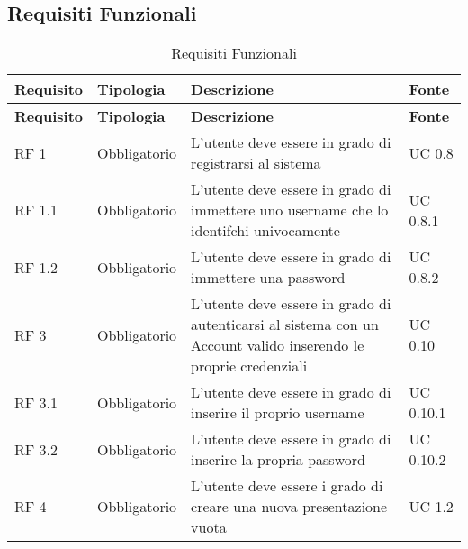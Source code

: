 \subsection{Requisiti Funzionali}{
	\renewcommand*{\arraystretch}{1.4}
	\begin{longtable} [c]{| p{2.5cm} | p{2.5cm} | p{6cm} |p{2.5cm}|}
		\caption{Requisiti Funzionali \label{tab:reqFunzionali}}\\
	 \hline
	 \textbf{Requisito} & \textbf{Tipologia} & \textbf{Descrizione} & \textbf{Fonte} \\
	 \hline
	 \endfirsthead
	 \hline
	 \textbf{Requisito} & \textbf{Tipologia} & \textbf{Descrizione} & \textbf{Fonte} \\
	 \hline
			\endhead
	 \hline
	 \endfoot
	 \hline
	 \endlastfoot
		RF 1 & Obbligatorio & L'utente deve essere in grado di registrarsi al sistema & UC 0.8\\
		\hline
		RF 1.1 & Obbligatorio & L'utente deve essere in grado di immettere uno username che lo identifchi univocamente & UC 0.8.1\\
		\hline
		RF 1.2 & Obbligatorio & L'utente deve essere in grado di immettere una password & UC 0.8.2\\
		\hline
		RF 3 & Obbligatorio & L'utente deve essere in grado di autenticarsi al sistema con un Account\ped{g} valido inserendo le proprie credenziali & UC 0.10\\
		\hline
		RF 3.1 & Obbligatorio & L'utente deve essere in grado di inserire il proprio username & UC 0.10.1\\		
		\hline
		RF 3.2 & Obbligatorio & L'utente deve essere in grado di inserire la propria password & UC 0.10.2\\
		\hline
		RF 4 & Obbligatorio & L’utente deve essere i grado di creare una nuova presentazione vuota & UC 1.2\\
		\hline	


\end{longtable}}
